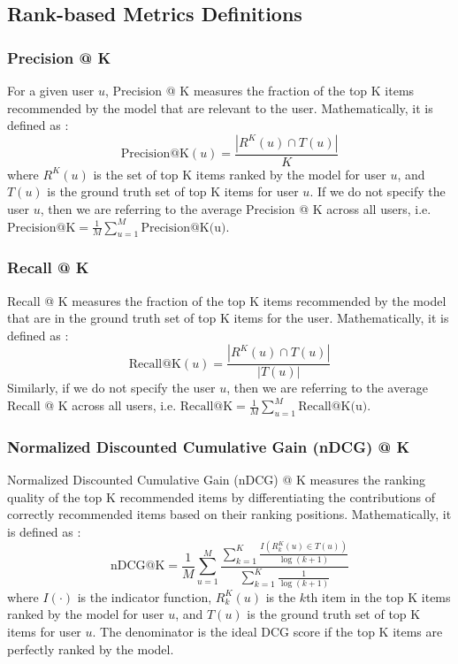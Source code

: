\documentclass{article}
\begin{document}
\subsection{Rank-based Metrics Definitions} \label{rank-metrics-def}

\subsubsection{Precision @ K}

For a given user $u$, Precision @ K measures the fraction of the top K items recommended by the model that are relevant to the user. Mathematically, it is defined as \cite{survey}:
$$
\mbox{Precision@K}(u) = \frac{| R^K(u) \cap T(u) |}{K}
$$
where $R^K(u)$ is the set of top K items ranked by the model for user $u$, and $T(u)$ is the ground truth set of top K items for user $u$. If we do not specify the user $u$, then we are referring to the average Precision @ K across all users, i.e. $\mbox{Precision@K} = \frac{1}{M} \sum_{u = 1}^M \mbox{Precision@K(u)}$.

\subsubsection{Recall @ K}

Recall @ K measures the fraction of the top K items recommended by the model that are in the ground truth set of top K items for the user. Mathematically, it is defined as \cite{survey}:
$$
\mbox{Recall@K}(u) = \frac{| R^K(u) \cap T(u) |}{|T(u)|}
$$
Similarly, if we do not specify the user $u$, then we are referring to the average Recall @ K across all users, i.e. $\mbox{Recall@K} = \frac{1}{M} \sum_{u = 1}^M \mbox{Recall@K(u)}$.

\subsubsection{Normalized Discounted Cumulative Gain (nDCG) @ K}

Normalized Discounted Cumulative Gain (nDCG) @ K measures the ranking quality of the top K recommended items by differentiating the contributions of correctly recommended items based on their ranking positions. Mathematically, it is defined as \cite{survey}:
$$
\mbox{nDCG@K} = \frac{1}{M} \sum_{u = 1}^M \frac{\sum_{k = 1}^K \frac{I(R^K_k(u) \in T(u))}{\log(k + 1)}}{\sum_{k = 1}^K \frac{1}{ \log(k + 1)}}
$$
where $I(\cdot)$ is the indicator function, $R^K_k(u)$ is the $k$th item in the top K items ranked by the model for user $u$, and $T(u)$ is the ground truth set of top K items for user $u$. The denominator is the ideal DCG score if the top K items are perfectly ranked by the model.
\end{document}
